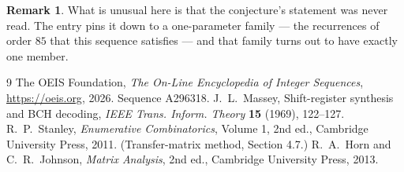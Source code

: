 \documentclass[11pt,a4paper]{article}
\theoremstyle{plain}
\theoremstyle{definition}
\newtheorem{remark}[theorem]{Remark}
\begin{document}
\begin{remark}
What is unusual here is that the conjecture's statement was never read. The entry pins it down
to a one-parameter family --- the recurrences of order $85$ that this sequence satisfies
--- and that family turns out to have exactly one member.
\end{remark}

\begin{thebibliography}{9}
 The OEIS Foundation, \emph{The On-Line Encyclopedia of Integer
Sequences}, \url{https://oeis.org}, 2026. Sequence A296318.
 J.~L.~Massey, Shift-register synthesis and BCH decoding, \emph{IEEE
Trans. Inform. Theory} \textbf{15} (1969), 122--127.
 R.~P.~Stanley, \emph{Enumerative Combinatorics}, Volume 1, 2nd ed.,
Cambridge University Press, 2011. (Transfer-matrix method, Section 4.7.)
 R.~A.~Horn and C.~R.~Johnson, \emph{Matrix Analysis}, 2nd ed., Cambridge
University Press, 2013.
\end{thebibliography}
\end{document}
